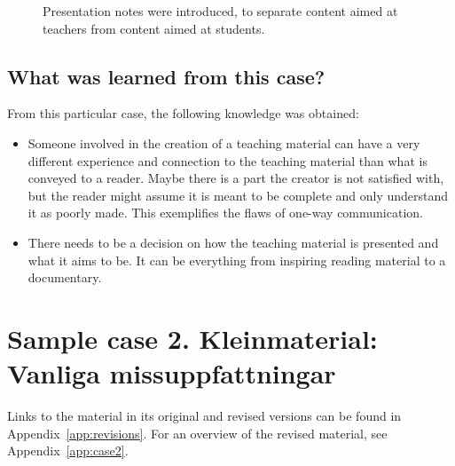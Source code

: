 \begin{figure}[H]
\centering
{}
\caption{Presentation notes were introduced, to separate content aimed at teachers from content aimed at students.}
\label{notes}
\end{figure}

\subsection{What was learned from this case?}
From this particular case, the following knowledge was obtained:
\begin{itemize}
    \item Someone involved in the creation of a teaching material can have a very different experience and connection to the teaching material than what is conveyed to a reader. Maybe there is a part the creator is not satisfied with, but the reader might assume it is meant to be complete and only understand it as poorly made. This exemplifies the flaws of one-way communication.
    \item There needs to be a decision on how the teaching material is presented and what it aims to be. It can be everything from inspiring reading material to a documentary.
\end{itemize}

\section{Sample case 2. Kleinmaterial: Vanliga missuppfattningar} \label{samplecase2}
Links to the material in its original and revised versions can be found in Appendix~\ref{app:revisions}. For an overview of the revised material, see Appendix~\ref{app:case2}. 

